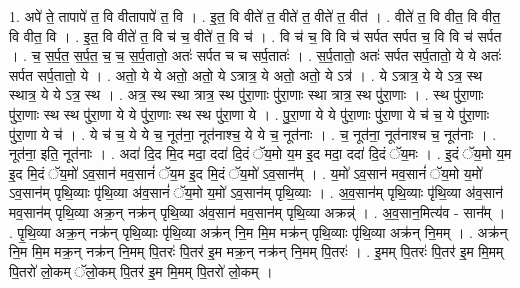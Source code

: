 \documentclass[17pt]{extarticle}
\begin{document}
1. अपे॑ ते॒ तापापे॑ त॒ वि वीतापापे॑ त॒ वि । . इ॒त॒ वि वीते॑ त॒ वीते॑ त॒ वीते॑ त॒ वीत॑ । . वीते॑ त॒ वि वीत॒ वि वीत॒ वि वीत॒ वि । . इ॒त॒ वि वीते॑ त॒ वि च॑ च॒ वीते॑ त॒ वि च॑ । . वि च॑ च॒ वि वि च॑ सर्पत सर्पत च॒ वि वि च॑ सर्पत । . च॒ स॒र्प॒त॒ स॒र्प॒त॒ च॒ च॒ स॒र्प॒तातो॒ अतः॑ सर्पत च च सर्प॒तातः॑ । . स॒र्प॒तातो॒ अतः॑ सर्पत सर्प॒तातो॒ ये ये अतः॑ सर्पत सर्प॒तातो॒ ये । . अतो॒ ये ये अतो॒ अतो॒ ये ऽत्रात्र॒ ये अतो॒ अतो॒ ये ऽत्र॑ । . ये ऽत्रात्र॒ ये ये ऽत्र॒ स्थ स्थात्र॒ ये ये ऽत्र॒ स्थ । . अत्र॒ स्थ स्था त्रात्र॒ स्थ पु॑रा॒णाः पु॑रा॒णाः स्था त्रात्र॒ स्थ पु॑रा॒णाः । . स्थ पु॑रा॒णाः पु॑रा॒णाः स्थ स्थ पु॑रा॒णा ये ये पु॑रा॒णाः स्थ स्थ पु॑रा॒णा ये । . पु॒रा॒णा ये ये पु॑रा॒णाः पु॑रा॒णा ये च॑ च॒ ये पु॑रा॒णाः पु॑रा॒णा ये च॑ । . ये च॑ च॒ ये ये च॒ नूत॑ना॒ नूत॑नाश्च॒ ये ये च॒ नूत॑नाः । . च॒ नूत॑ना॒ नूत॑नाश्च च॒ नूत॑नाः । . नूत॑ना॒ इति॒ नूत॑नाः । . अदा॑ दि॒द मि॒द मदा॒ ददा॑ दि॒दं ॅय॒मो य॒म इ॒द मदा॒ ददा॑ दि॒दं ॅय॒मः । . इ॒दं ॅय॒मो य॒म इ॒द मि॒दं ॅय॒मो॑ ऽव॒सान॑ मव॒सानं॑ ॅय॒म इ॒द मि॒दं ॅय॒मो॑ ऽव॒सान᳚म् । . य॒मो॑ ऽव॒सान॑ मव॒सानं॑ ॅय॒मो य॒मो॑ ऽव॒सान॑म् पृथि॒व्याः पृ॑थि॒व्या अ॑व॒सानं॑ ॅय॒मो य॒मो॑ ऽव॒सान॑म् पृथि॒व्याः । . अ॒व॒सान॑म् पृथि॒व्याः पृ॑थि॒व्या अ॑व॒सान॑ मव॒सान॑म् पृथि॒व्या अक्र॒न् नक्र॑न् पृथि॒व्या अ॑व॒सान॑ मव॒सान॑म् पृथि॒व्या अक्रन्न्॑ । . अ॒व॒सान॒मित्य॑व - सान᳚म् । . पृ॒थि॒व्या अक्र॒न् नक्र॑न् पृथि॒व्याः पृ॑थि॒व्या अक्र॑न् नि॒म मि॒म मक्र॑न् पृथि॒व्याः पृ॑थि॒व्या अक्र॑न् नि॒मम् । . अक्र॑न् नि॒म मि॒म मक्र॒न् नक्र॑न् नि॒मम् पि॒तरः॑ पि॒तर॑ इ॒म मक्र॒न् नक्र॑न् नि॒मम् पि॒तरः॑ । . इ॒मम् पि॒तरः॑ पि॒तर॑ इ॒म मि॒मम् पि॒तरो॑ लो॒कम् ॅलो॒कम् पि॒तर॑ इ॒म मि॒मम् पि॒तरो॑ लो॒कम् । \newline
\end{document}
